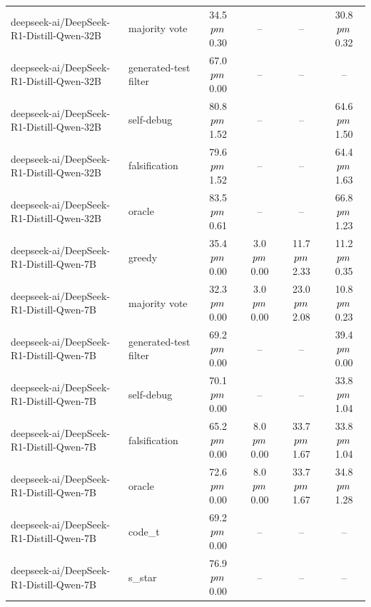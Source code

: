 \begin{tabular}{llcccc}
deepseek-ai/DeepSeek-R1-Distill-Qwen-32B & majority vote & 34.5 $\\pm$ 0.30 & -- & -- & 30.8 $\\pm$ 0.32 \\
deepseek-ai/DeepSeek-R1-Distill-Qwen-32B & generated-test filter & 67.0 $\\pm$ 0.00 & -- & -- & -- \\
deepseek-ai/DeepSeek-R1-Distill-Qwen-32B & self-debug & 80.8 $\\pm$ 1.52 & -- & -- & 64.6 $\\pm$ 1.50 \\
deepseek-ai/DeepSeek-R1-Distill-Qwen-32B & falsification & 79.6 $\\pm$ 1.52 & -- & -- & 64.4 $\\pm$ 1.63 \\
deepseek-ai/DeepSeek-R1-Distill-Qwen-32B & oracle & 83.5 $\\pm$ 0.61 & -- & -- & 66.8 $\\pm$ 1.23 \\
deepseek-ai/DeepSeek-R1-Distill-Qwen-7B & greedy & 35.4 $\\pm$ 0.00 & 3.0 $\\pm$ 0.00 & 11.7 $\\pm$ 2.33 & 11.2 $\\pm$ 0.35 \\
deepseek-ai/DeepSeek-R1-Distill-Qwen-7B & majority vote & 32.3 $\\pm$ 0.00 & 3.0 $\\pm$ 0.00 & 23.0 $\\pm$ 2.08 & 10.8 $\\pm$ 0.23 \\
deepseek-ai/DeepSeek-R1-Distill-Qwen-7B & generated-test filter & 69.2 $\\pm$ 0.00 & -- & -- & 39.4 $\\pm$ 0.00 \\
deepseek-ai/DeepSeek-R1-Distill-Qwen-7B & self-debug & 70.1 $\\pm$ 0.00 & -- & -- & 33.8 $\\pm$ 1.04 \\
deepseek-ai/DeepSeek-R1-Distill-Qwen-7B & falsification & 65.2 $\\pm$ 0.00 & 8.0 $\\pm$ 0.00 & 33.7 $\\pm$ 1.67 & 33.8 $\\pm$ 1.04 \\
deepseek-ai/DeepSeek-R1-Distill-Qwen-7B & oracle & 72.6 $\\pm$ 0.00 & 8.0 $\\pm$ 0.00 & 33.7 $\\pm$ 1.67 & 34.8 $\\pm$ 1.28 \\
deepseek-ai/DeepSeek-R1-Distill-Qwen-7B & code_t & 69.2 $\\pm$ 0.00 & -- & -- & -- \\
deepseek-ai/DeepSeek-R1-Distill-Qwen-7B & s_star & 76.9 $\\pm$ 0.00 & -- & -- & -- \\
\bottomrule
\end{tabular}
